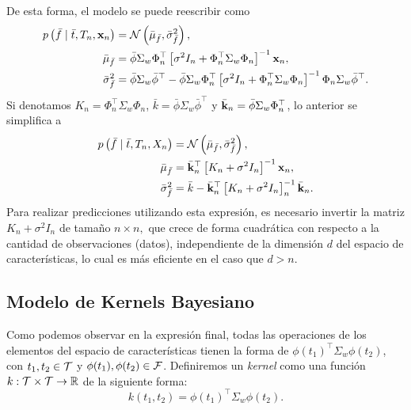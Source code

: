 De esta forma, el modelo se puede reescribir como
\begin{align*}
	p \left(\bar{f} \mid \bar{t}, T_n, \mathbf{x}_n\right)	&= \mathcal{N} \left(\bar{\mu}_{\bar{f}}, \bar{\sigma}_{\bar{f}}^2\right),\\
	\bar{\mu}_{\bar{f}}									&= \bar{\phi} \Sigma_w \Phi_n^{\top} \left[\sigma^2 I_n + \Phi_n^{\top} \Sigma_w \Phi_n \right]^{-1}\mathbf{x}_n,\\
	\bar{\sigma}_{\bar{f}}^2							&= \bar{\phi} \Sigma_w \bar{\phi}^{\top} - \bar{\phi} \Sigma_w \Phi_n^{\top} \left[\sigma^2 I_n + \Phi_n^{\top} \Sigma_w \Phi_n\right]^{-1} \Phi_n \Sigma_w \bar{\phi}^{\top}.
\end{align*}
Si denotamos \(K_n = \Phi_n^{\top} \Sigma_w \Phi_n\), \(\bar{k} = \bar{\phi} \Sigma_w \bar{\phi}^{\top}\) y \(\bar{\mathbf{k}}_n = \bar{\phi} \Sigma_w \Phi_n^{\top}\), lo anterior se simplifica a
\begin{align*}
	p \left(\bar{f} \mid \bar{t}, T_n, X_n\right)	&= \mathcal{N} \left(\bar{\mu}_{\bar{f}}, \bar{\sigma}_{\bar{f}}^2\right), \\
	\bar{\mu}_{\bar{f}}								&= \bar{\mathbf{k}}_n^{\top} \left[K_n + \sigma^2 I_n\right]^{-1} \mathbf{x}_n, \\
	\bar{\sigma}_{\bar{f}}^2						&= \bar{k} - \bar{\mathbf{k}}_n^{\top} \left[K_n + \sigma^2 I_n\right]_n^{-1} \bar{\mathbf{k}}_n.
\end{align*}
Para realizar predicciones utilizando esta expresión, es necesario invertir la matriz \(K_n + \sigma^2 I_n\) de tamaño \(n \times n,\) que crece de forma cuadrática con respecto a la cantidad de observaciones (datos), independiente de la dimensión \(d\) del espacio de características, lo cual es más eficiente en el caso que \(d > n\).

\subsection{Modelo de Kernels Bayesiano}

Como podemos observar en la expresión final, todas las operaciones de los elementos del espacio de características tienen la forma de \(\phi(t_{1})^{\top} \Sigma_w \phi(t_{2})\), con \(t_{1}, t_{2} \in \mathcal{T}\) y \(\phi(t_{1}), \phi(t_{2}) \in \mathcal{F}\). Definiremos un \emph{kernel} como una función \(k : \mathcal{T} \times \mathcal{T} \to \mathbb{R}\) de la siguiente forma:
\begin{equation*}
	k(t_{1}, t_{2}) = \phi(t_{1})^{\top} \Sigma_w \phi(t_{2}).
\end{equation*}


